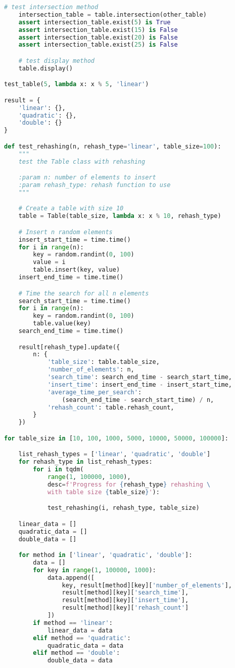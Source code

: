 \documentclass{article}
\begin{document}
\begin{lstlisting}[language=Python,label={lst:codesrc}]
    # test intersection method
    intersection_table = table.intersection(other_table)
    assert intersection_table.exist(5) is True
    assert intersection_table.exist(15) is False
    assert intersection_table.exist(20) is False
    assert intersection_table.exist(25) is False

    # test display method
    table.display()

test_table(5, lambda x: x % 5, 'linear')

result = {
    'linear': {},
    'quadratic': {},
    'double': {}
}

def test_rehashing(n, rehash_type='linear', table_size=100):
    """
    test the Table class with rehashing

    :param n: number of elements to insert
    :param rehash_type: rehash function to use
    """

    # Create a table with size 10
    table = Table(table_size, lambda x: x % 10, rehash_type)

    # Insert n random elements
    insert_start_time = time.time()
    for i in range(n):
        key = random.randint(0, 100)
        value = i
        table.insert(key, value)
    insert_end_time = time.time()

    # Time the search for all n elements
    search_start_time = time.time()
    for i in range(n):
        key = random.randint(0, 100)
        table.value(key)
    search_end_time = time.time()

    result[rehash_type].update({
        n: {
            'table_size': table.table_size,
            'number_of_elements': n,
            'search_time': search_end_time - search_start_time,
            'insert_time': insert_end_time - insert_start_time,
            'average_time_per_search':
                (search_end_time - search_start_time) / n,
            'rehash_count': table.rehash_count,
        }
    })

for table_size in [10, 100, 1000, 5000, 10000, 50000, 100000]:

    list_rehash_types = ['linear', 'quadratic', 'double']
    for rehash_type in list_rehash_types:
        for i in tqdm(
            range(1, 100000, 1000),
            desc=f'Progress for {rehash_type} rehashing \
            with table size {table_size}'):

            test_rehashing(i, rehash_type, table_size)

    linear_data = []
    quadratic_data = []
    double_data = []

    for method in ['linear', 'quadratic', 'double']:
        data = []
        for key in range(1, 100000, 1000):
            data.append([
                key, result[method][key]['number_of_elements'],
                result[method][key]['search_time'],
                result[method][key]['insert_time'],
                result[method][key]['rehash_count']
            ])
        if method == 'linear':
            linear_data = data
        elif method == 'quadratic':
            quadratic_data = data
        elif method == 'double':
            double_data = data


\end{lstlisting}
\end{document}
